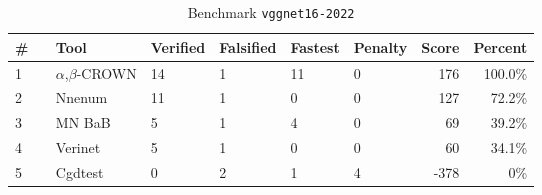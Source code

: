 
\begin{table}[h]
\begin{center}
\caption{Benchmark \texttt{vggnet16-2022}} \label{tab:cat_{cat}}
{\setlength{\tabcolsep}{2pt}
\begin{tabular}[h]{@{}llllllrr@{}}
\toprule
\textbf{\# ~} & \textbf{Tool} & \textbf{Verified} & \textbf{Falsified} & \textbf{Fastest} & \textbf{Penalty} & \textbf{Score} & \textbf{Percent}\\
\midrule
1 & $\alpha$,$\beta$-CROWN & 14 & 1 & 11 & 0 & 176 & 100.0\% \\
2 & Nnenum & 11 & 1 & 0 & 0 & 127 & 72.2\% \\
3 & MN BaB & 5 & 1 & 4 & 0 & 69 & 39.2\% \\
4 & Verinet & 5 & 1 & 0 & 0 & 60 & 34.1\% \\
5 & Cgdtest & 0 & 2 & 1 & 4 & -378 & 0\% \\
\bottomrule
\end{tabular}
}
\end{center}
\end{table}


